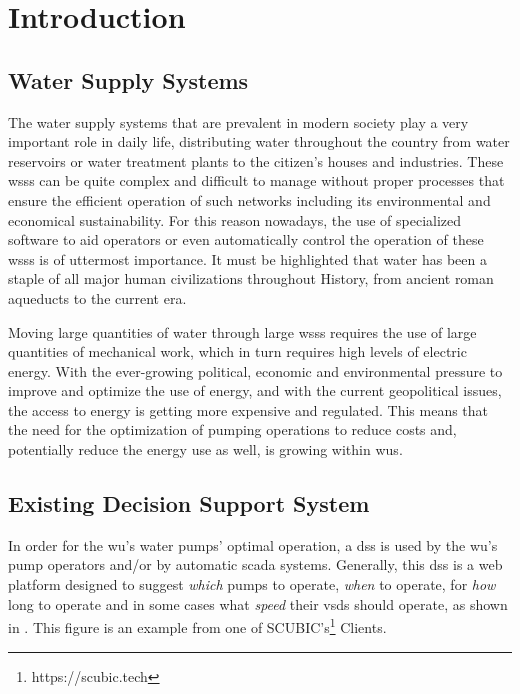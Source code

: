 \chapter{Introduction}\label{intro}




\section{Water Supply Systems}\label{intro:s:water-supply-systems}

The water supply systems that are prevalent in modern society play a very important role in daily life, distributing water throughout the country from water reservoirs or water treatment plants to the citizen's houses and industries. These \glspl{wss} can be quite complex and difficult to manage without proper processes that ensure the efficient operation of such networks including its environmental and economical sustainability. For this reason nowadays, the use of specialized software to aid operators or even automatically control the operation of these \glspl{wss} is of uttermost importance. It must be highlighted that water has been a staple of all major human civilizations throughout History, from ancient roman aqueducts to the current era.

Moving large quantities of water through large \glspl{wss} requires the use of large quantities of mechanical work, which in turn requires high levels of electric energy. With the ever-growing political, economic and environmental pressure to improve and optimize the use of energy, and with the current geopolitical issues, the access to energy is getting more expensive and regulated. This means that the need for the optimization of pumping operations to reduce costs and, potentially reduce the energy use as well, is growing within \glspl{wu}.

\section{Existing Decision Support System}\label{intro:s:existing-decision-support-system}

In order for the \gls{wu}'s water pumps' optimal operation, a \gls{dss} is used by the \gls{wu}'s pump operators and/or by automatic \gls{scada} systems. Generally, this \gls{dss} is a web platform designed to suggest \textit{which} pumps to operate, \textit{when} to operate, for \textit{how} long to operate and in some cases what \textit{speed} their \glspl{vsd} should operate, as shown in . This figure is an example from one of SCUBIC's\footnote{https://scubic.tech\label{foot:scubic}} Clients.

